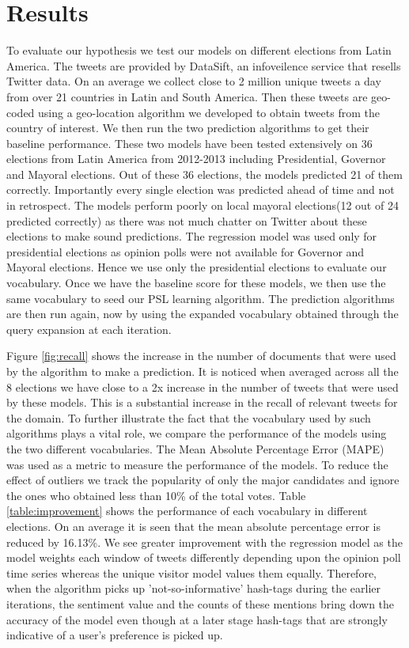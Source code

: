 \section{Results}
To evaluate our hypothesis we test our models on different elections from Latin America.
The tweets are provided by DataSift, an infoveilence service that resells Twitter data.
On an average we collect close to 2 million unique tweets a day from over 21 countries in Latin and South America.
Then these tweets are geo-coded using a geo-location algorithm we developed to obtain tweets from the country of interest.
We then run the two prediction algorithms to get their baseline performance.
These two models have been tested extensively on 36 elections from Latin America from 2012-2013 including Presidential, Governor and Mayoral elections. 
Out of these 36 elections, the models predicted 21 of them correctly. 
Importantly every single election was predicted ahead of time and not in retrospect.
The models perform poorly on local mayoral elections(12 out of 24 predicted correctly) as there was not much chatter on Twitter about these elections to make sound predictions. 
The regression model was used only for presidential elections as opinion polls were not available for Governor and Mayoral elections.
Hence we use only the presidential elections to evaluate our vocabulary.
Once we have the baseline score for these models, we then use the same vocabulary to seed our PSL learning algorithm. 
The prediction algorithms are then run again, now by using the expanded vocabulary obtained through the query expansion at each iteration.

Figure \ref{fig:recall} shows the increase in the number of documents that were used by the algorithm to make a prediction.
It is noticed when averaged across all the 8 elections we have close to a 2x increase in the number of tweets that were used by these models.
This is a substantial increase in the recall of relevant tweets for the domain.
To further illustrate the fact that the vocabulary used by such algorithms plays a vital role, we compare the performance of the models using the two different vocabularies.
The Mean Absolute Percentage Error (MAPE) was used as a metric to measure the performance of the models. 
To reduce the effect of outliers we track the popularity of only the major candidates and ignore the ones who obtained less than 10\% of the total votes.
Table \ref{table:improvement} shows the performance of each vocabulary in different elections. 
On an average it is seen that the mean absolute percentage error is reduced by 16.13\%.
We see greater improvement with the regression model as the model weights each window of tweets differently depending upon the opinion poll time series whereas the unique visitor model values them equally. 
Therefore, when the algorithm picks up 'not-so-informative' hash-tags during the earlier iterations, the sentiment value and the counts of these mentions bring down the accuracy of the model even though at a later stage hash-tags that are strongly indicative of a user's preference is picked up. 

